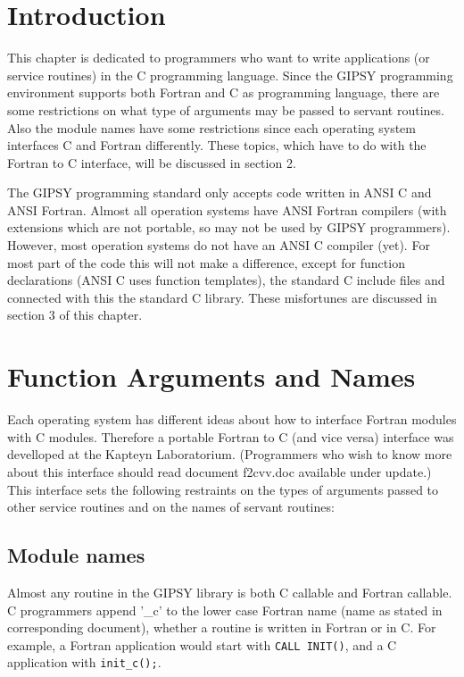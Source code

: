 \section{Introduction}

This chapter is dedicated to programmers who want to write applications
(or service routines) in the C programming language.  Since the GIPSY
programming environment supports both Fortran and C as programming
language, there are some restrictions on what type of arguments may be
passed to servant routines.  Also the module names have some
restrictions since each operating system interfaces C and Fortran
differently.  These topics, which have to do with the Fortran to C
interface, will be discussed in section 2. 

The GIPSY programming standard only accepts code written in ANSI C and
ANSI Fortran.  Almost all operation systems have ANSI Fortran compilers
(with extensions which are not portable, so may not be used by GIPSY
programmers). However, most operation systems do not have an ANSI C
compiler (yet). For most part of the code this will not make a
difference, except for function declarations (ANSI C uses function
templates), the standard C include files and connected with this the
standard C library. These misfortunes are discussed in section 3 of this
chapter.

\section{Function Arguments and Names}

Each operating system has different ideas about how to interface Fortran
modules with C modules.  Therefore a portable Fortran to C (and vice
versa) interface was develloped at the Kapteyn Laboratorium. 
(Programmers who wish to know more about this interface should read
document f2cvv.doc available under update.) This interface sets the
following restraints on the types of arguments passed to other service
routines and on the names of servant routines:

\subsection{Module names}

Almost any routine in the GIPSY library is both C callable and Fortran
callable.  C programmers append '\_c' to the lower case Fortran name
(name as stated in corresponding document), whether a routine is written
in Fortran or in C.  For example, a Fortran application would start with
{\tt CALL INIT()}, and a C application with {\tt init\_c();}. 

